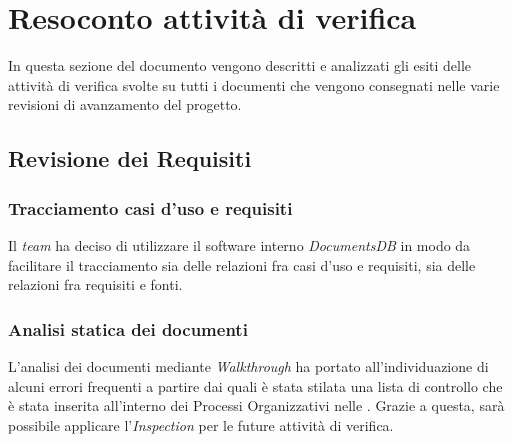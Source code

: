 \newpage
\section{Resoconto attività di verifica}
In questa sezione del documento vengono descritti e analizzati gli esiti delle attività di verifica svolte su tutti i documenti che vengono consegnati nelle varie revisioni di avanzamento del progetto.

\subsection{Revisione dei Requisiti}

\subsubsection{Tracciamento casi d'uso e requisiti}
Il \textit{team} ha deciso di utilizzare il software interno \textit{DocumentsDB} in modo da facilitare il tracciamento sia delle relazioni fra casi d'uso e requisiti, sia delle relazioni fra requisiti e fonti.

\subsubsection{Analisi statica dei documenti}
L'analisi dei documenti mediante \textit{Walkthrough} ha portato all'individuazione di alcuni errori frequenti a partire dai quali è stata stilata una lista di controllo che è stata inserita all'interno dei Processi Organizzativi nelle \textit{\NdP}. Grazie a questa, sarà possibile applicare l'\textit{Inspection} per le future attività di verifica.

